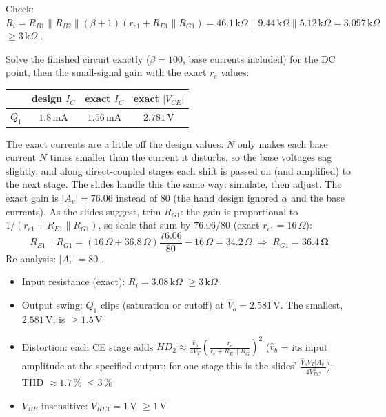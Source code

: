 \documentclass[11pt]{article}
\newcommand{\solstep}[2]{\par\medskip{\color{stepc}\textbf{Step #1 --- #2}}\par\nopagebreak}
\begin{document}
Check: $R_i = R_{B1}\|R_{B2}\|(\beta+1)(r_{e1} + R_{E1}\|R_{G1}) = 46.1\,\mathrm{k}\Omega\|9.44\,\mathrm{k}\Omega\|5.12\,\mathrm{k}\Omega = 3.097\,\mathrm{k}\Omega$ $\ge 3\,\mathrm{k}\Omega$ \checkmark.
\solstep{4}{Check by analysis}Solve the finished circuit exactly ($\beta=100$, base currents included) for the DC point, then the small-signal gain with the exact $r_e$ values:\begin{center}\renewcommand{\arraystretch}{1.35}
\begin{tabular}{cccc}
\toprule
 & design $I_C$ & exact $I_C$ & exact $|V_{CE}|$ \\
\midrule
$Q_{1}$ & $1.8\,\mathrm{m}\mathrm{A}$ & $1.56\,\mathrm{m}\mathrm{A}$ & $2.781\,\mathrm{V}$ \\
\bottomrule
\end{tabular}\end{center}
The exact currents are a little off the design values: $N$ only makes each base current $N$ times smaller than the current it disturbs, so the base voltages sag slightly, and along direct-coupled stages each shift is passed on (and amplified) to the next stage. The slides handle this the same way: simulate, then adjust. The exact gain is $|A_v| = 76.06$ instead of $80$ (the hand design ignored $\alpha$ and the base currents). As the slides suggest, trim $R_{G1}$: the gain is proportional to $1/(r_{e1} + R_{E1}\|R_{G1})$, so scale that sum by $76.06/80$ (exact $r_{e1} = 16\,\Omega$):\[R_{E1}\|R_{G1} = (16\,\Omega + 36.8\,\Omega)\frac{76.06}{80} - 16\,\Omega = 34.2\,\Omega \;\Rightarrow\; R_{G1} = \mathbf{36.4\,\Omega}\]Re-analysis: $|A_v| = 80$ \checkmark. \begin{itemize}[leftmargin=*,itemsep=2pt]
\item Input resistance (exact): $R_i = 3.08\,\mathrm{k}\Omega$ $\ge 3\,\mathrm{k}\Omega$ \checkmark
\item Output swing: $Q_{1}$ clips (saturation or cutoff) at $\hat V_o = 2.581\,\mathrm{V}$. The smallest, $2.581\,\mathrm{V}$, is $\ge 1.5$\,V \checkmark
\item Distortion: each CE stage adds $HD_2 \approx \frac{\hat v_b}{4V_T}\left(\frac{r_e}{r_e + R_E\|R_G}\right)^2$ ($\hat v_b$ = its input amplitude at the specified output; for one stage this is the slides' $\frac{\hat V_o V_T |A_v|}{4V_{RC}^2}$): THD $\approx 1.7\,\%$ $\le 3\,\%$ \checkmark
\item $V_{BE}$-insensitive: $V_{RE1} = 1$\,V $\ge 1$\,V \checkmark
\end{itemize}
\end{document}
